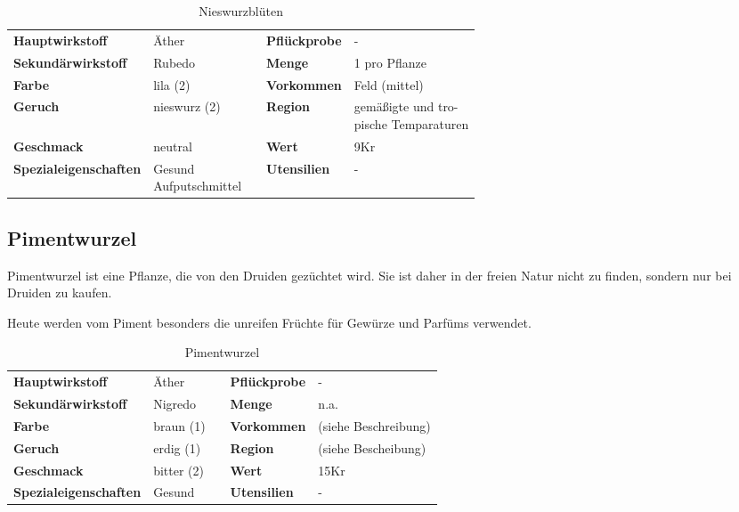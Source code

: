 \begin{table}[H] 
\begin{center} 
\begin{tabular}{|l|l|p{1cm}|l|l|} 
  	\cline{1-2} \cline{4-5} 
  	\textbf{Hauptwirkstoff} & Äther && \textbf{Pflückprobe} & - \\ \cline{1-2} \cline{4-5} 
  	\textbf{Sekundärwirkstoff} & Rubedo && \textbf{Menge} & 1 pro Pflanze \\ \cline{1-2} \cline{4-5} 
  	\textbf{Farbe} & lila (2) && \textbf{Vorkommen} & Feld (mittel) \\ \cline{1-2} \cline{4-5} 
  	\textbf{Geruch} & nieswurz (2) && \textbf{Region} & \brcell{gemäßigte und tro- \\ pische Temparaturen} \\ \cline{1-2} \cline{4-5} 
  	\textbf{Geschmack} & neutral && \textbf{Wert} & 9Kr \\ \cline{1-2} \cline{4-5} 
  	\textbf{Spezialeigenschaften} & \brcell{Gesund \\ Aufputschmittel} && \textbf{Utensilien} & - \\ \cline{1-2} \cline{4-5} 
\end{tabular} 
\end{center} 
\caption{Nieswurzblüten} 
\label{tab:nieswurzblueten} 
\end{table}

\subsection{Pimentwurzel}
Pimentwurzel ist eine Pflanze, die von den Druiden gezüchtet wird. Sie ist daher in der freien Natur nicht zu finden, sondern nur bei Druiden zu kaufen.

Heute werden vom Piment besonders die unreifen Früchte für Gewürze und Parfüms verwendet.

\begin{table}[H] 
\begin{center} 
\begin{tabular}{|l|l|p{1cm}|l|l|} 
  	\cline{1-2} \cline{4-5} 
  	\textbf{Hauptwirkstoff} & Äther && \textbf{Pflückprobe} & - \\ \cline{1-2} \cline{4-5} 
  	\textbf{Sekundärwirkstoff} & Nigredo && \textbf{Menge} & n.a. \\ \cline{1-2} \cline{4-5} 
  	\textbf{Farbe} & braun (1) && \textbf{Vorkommen} & (siehe Beschreibung) \\ \cline{1-2} \cline{4-5} 
  	\textbf{Geruch} & erdig (1) && \textbf{Region} & (siehe Bescheibung) \\ \cline{1-2} \cline{4-5} 
  	\textbf{Geschmack} & bitter (2) && \textbf{Wert} & 15Kr \\ \cline{1-2} \cline{4-5} 
  	\textbf{Spezialeigenschaften} & Gesund && \textbf{Utensilien} & - \\ \cline{1-2} \cline{4-5} 
\end{tabular} 
\end{center} 
\caption{Pimentwurzel} 
\label{tab:pimentwurzel} 
\end{table}


